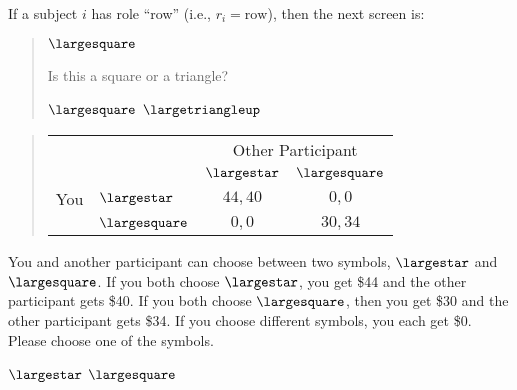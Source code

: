 \documentclass[11pt]{article}
\begin{document}
If a subject $i$ has role ``row'' (i.e., $r_i=\text{row}$), then the next screen is:
\begin{tcolorbox}
\begin{quote}
\begin{center}
{\Huge $\largesquare$}
\end{center}
 \centering Is this a square or a triangle?

 \begin{center}
$\largesquare$ \qquad $\largetriangleup$
\end{center}
\end{quote}

\begin{quote}
\begin{center}
\begin{tabular}{llcc}
    & & \multicolumn{2}{c}{Other Participant}  \\
& & $\largestar$ & $\largesquare$  \\ \cline{3-4}
You & $\largestar$ & \multicolumn{1}{|c|}{$44,40$} & \multicolumn{1}{c|}{$0,0$}  \\ \cline{3-4}
& $\largesquare$ & \multicolumn{1}{|c|}{$0,0$} & \multicolumn{1}{c|}{$30,34$}  \\ \cline{3-4}
\end{tabular}
\end{center}
\end{quote}

You and another participant can choose between two symbols, $\largestar$ and $\largesquare$. If you both choose $\largestar$, you get \$44 and the other participant gets \$40. If you both choose $\largesquare$, then you get \$30 and the other participant gets \$34. If you choose different symbols, you each get \$0.\\

Please choose one of the symbols.\\


\begin{center}
$\largestar$ \qquad $\largesquare$
\end{center}
\end{tcolorbox}
\end{document}
